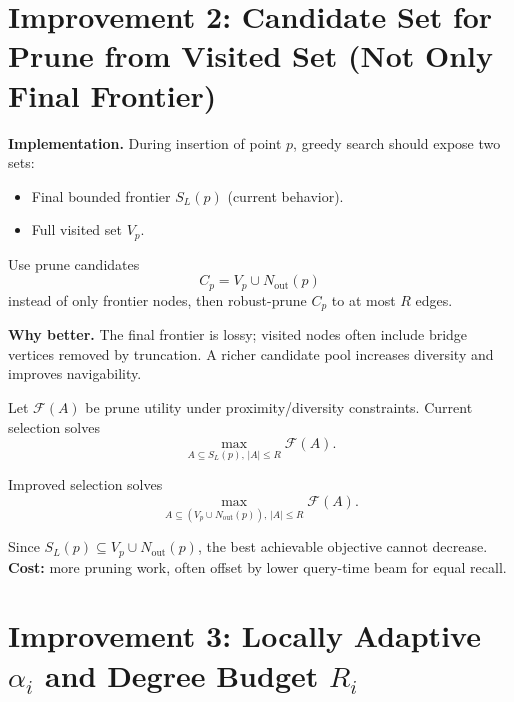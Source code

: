 \documentclass[11pt]{article}
\begin{document}
\section{Improvement 2: Candidate Set for Prune from Visited Set (Not Only Final Frontier)}

\textbf{Implementation.}
During insertion of point $p$, greedy search should expose two sets:
\begin{itemize}
    \item Final bounded frontier $S_L(p)$ (current behavior).
    \item Full visited set $V_p$.
\end{itemize}

Use prune candidates
\begin{equation}
C_p = V_p \cup N_{\text{out}}(p)
\end{equation}
instead of only frontier nodes, then robust-prune $C_p$ to at most $R$ edges.

\textbf{Why better.} The final frontier is lossy; visited nodes often include bridge vertices removed by truncation. A richer candidate pool increases diversity and improves navigability.

Let $\mathcal{F}(A)$ be prune utility under proximity/diversity constraints. Current selection solves
\begin{equation}
\max_{A\subseteq S_L(p),\,|A|\le R} \mathcal{F}(A).
\end{equation}

Improved selection solves
\begin{equation}
\max_{A\subseteq (V_p\cup N_{\text{out}}(p)),\,|A|\le R} \mathcal{F}(A).
\end{equation}

Since $S_L(p)\subseteq V_p\cup N_{\text{out}}(p)$, the best achievable objective cannot decrease. \textbf{Cost:} more pruning work, often offset by lower query-time beam for equal recall.

\section{Improvement 3: Locally Adaptive $\alpha_i$ and Degree Budget $R_i$}
\end{document}

